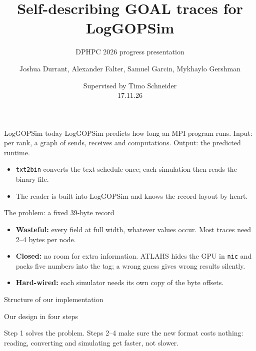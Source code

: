 \documentclass[aspectratio=169,11pt]{beamer}
\title{Self-describing GOAL traces for LogGOPSim}
\subtitle{DPHPC 2026 progress presentation}
\author{Joshua Durrant, Alexander Falter, Samuel Garcin, Mykhaylo Gershman}
\date{Supervised by Timo Schneider \\ 17.11.26}
\newcommand{\diagram}[1]{\resizebox{\linewidth}{!}{}}
\newcommand{\highlight}[1]{\colorbox{cream}{\parbox{\dimexpr\linewidth-2\fboxsep}{\small #1}}}
\begin{document}
\begin{frame}
\titlepage
\end{frame}


\begin{frame}{LogGOPSim today}
\small
LogGOPSim predicts how long an MPI program runs. Input: per rank, a graph of sends, receives and computations. Output: the predicted runtime.
\vspace{5mm}

{\centering\diagram{original-overview}\par}
\vspace{5mm}
\begin{itemize}
\item \texttt{txt2bin} converts the text schedule once; each simulation then reads the binary file.
\item The reader is built into LogGOPSim and knows the record layout by heart.
\end{itemize}
\end{frame}

\begin{frame}{The problem: a fixed 39-byte record}
\diagram{legacy-record}
\vspace{4mm}
\begin{itemize}
\item \textbf{Wasteful:} every field at full width, whatever values occur. Most traces need 2--4 bytes per node.
\item \textbf{Closed:} no room for extra information. ATLAHS hides the GPU in \texttt{nic} and packs five numbers into the tag; a wrong guess gives wrong results silently.
\item \textbf{Hard-wired:} each simulator needs its own copy of the byte offsets.
\end{itemize}
\end{frame}

\begin{frame}{Structure of our implementation}
\centering\vfill
\diagram{design-overview}
\vfill
\end{frame}

\begin{frame}{Our design in four steps}
\centering\vfill
\diagram{design-steps}
\vfill
\par\raggedright
\highlight{Step 1 solves the problem. Steps 2--4 make sure the new format costs nothing: reading, converting and simulating get faster, not slower.}
\end{frame}
\end{document}
